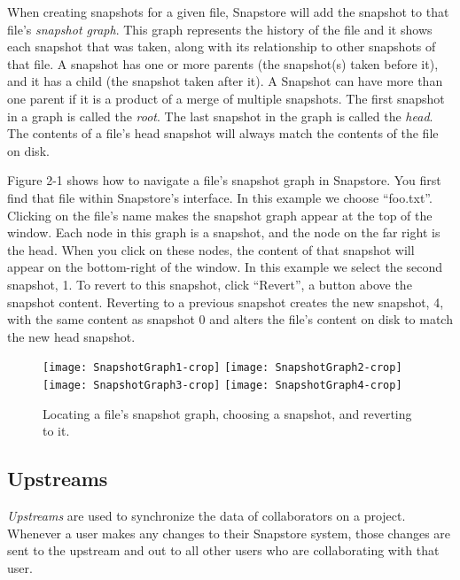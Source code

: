 When creating snapshots for a given file, Snapstore will add the snapshot to that file's \textit{snapshot graph}. This graph represents the history of the file and it shows each snapshot that was taken, along with its relationship to other snapshots of that file. A snapshot has one or more parents (the snapshot(s) taken before it), and it has a child (the snapshot taken after it). A Snapshot can have more than one parent if it is a product of a merge of multiple snapshots. The first snapshot in a graph is called the \textit{root}. The last snapshot in the graph is called the \textit{head}. The contents of a file's head snapshot will always match the contents of the file on disk.

Figure 2-1 shows how to navigate a file's snapshot graph in Snapstore. You first find that file within Snapstore's interface. In this example we choose ``foo.txt''. Clicking on the file's name makes the snapshot graph appear at the top of the window. Each node in this graph is a snapshot, and the node on the far right is the head. When you click on these nodes, the content of that snapshot will appear on the bottom-right of the window. In this example we select the second snapshot, 1. To revert to this snapshot, click ``Revert'', a button above the snapshot content. Reverting to a previous snapshot creates the new snapshot, 4, with the same content as snapshot 0 and alters the file's content on disk to match the new head snapshot.

\begin{figure}
\begin{center}
\texttt{[image: SnapshotGraph1-crop]}
\vspace{3 mm}
\texttt{[image: SnapshotGraph2-crop]}
\vspace{3 mm}
\texttt{[image: SnapshotGraph3-crop]}
\texttt{[image: SnapshotGraph4-crop]}
\end{center}
\caption{Locating a file's snapshot graph, choosing a snapshot, and reverting to it.}
\label{arm:fig1}
\end{figure}

\subsection{Upstreams}

\textit{Upstreams} are used to synchronize the data of collaborators on a project. Whenever a user makes any changes to their Snapstore system, those changes are sent to the upstream and out to all other users who are collaborating with that user.

